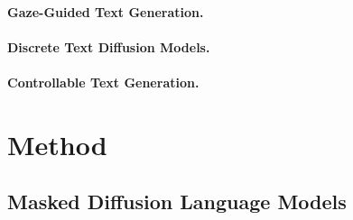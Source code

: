 \documentclass[11pt]{article}
\begin{document}

\paragraph{Gaze-Guided Text Generation.}

\paragraph{Discrete Text Diffusion Models.}

\paragraph{Controllable Text Generation.}

\section{Method}
\label{sec:method}




\subsection{Masked Diffusion Language Models}
\label{sec:method:mdlm}
\end{document}

